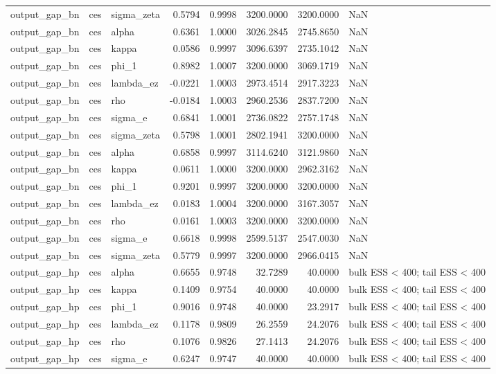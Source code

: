 \begin{tabular}{lllrrrrl}
output\_gap\_bn & ces & sigma\_zeta & 0.5794 & 0.9998 & 3200.0000 & 3200.0000 & NaN \\
output\_gap\_bn & ces & alpha & 0.6361 & 1.0000 & 3026.2845 & 2745.8650 & NaN \\
output\_gap\_bn & ces & kappa & 0.0586 & 0.9997 & 3096.6397 & 2735.1042 & NaN \\
output\_gap\_bn & ces & phi\_1 & 0.8982 & 1.0007 & 3200.0000 & 3069.1719 & NaN \\
output\_gap\_bn & ces & lambda\_ez & -0.0221 & 1.0003 & 2973.4514 & 2917.3223 & NaN \\
output\_gap\_bn & ces & rho & -0.0184 & 1.0003 & 2960.2536 & 2837.7200 & NaN \\
output\_gap\_bn & ces & sigma\_e & 0.6841 & 1.0001 & 2736.0822 & 2757.1748 & NaN \\
output\_gap\_bn & ces & sigma\_zeta & 0.5798 & 1.0001 & 2802.1941 & 3200.0000 & NaN \\
output\_gap\_bn & ces & alpha & 0.6858 & 0.9997 & 3114.6240 & 3121.9860 & NaN \\
output\_gap\_bn & ces & kappa & 0.0611 & 1.0000 & 3200.0000 & 2962.3162 & NaN \\
output\_gap\_bn & ces & phi\_1 & 0.9201 & 0.9997 & 3200.0000 & 3200.0000 & NaN \\
output\_gap\_bn & ces & lambda\_ez & 0.0183 & 1.0004 & 3200.0000 & 3167.3057 & NaN \\
output\_gap\_bn & ces & rho & 0.0161 & 1.0003 & 3200.0000 & 3200.0000 & NaN \\
output\_gap\_bn & ces & sigma\_e & 0.6618 & 0.9998 & 2599.5137 & 2547.0030 & NaN \\
output\_gap\_bn & ces & sigma\_zeta & 0.5779 & 0.9997 & 3200.0000 & 2966.0415 & NaN \\
output\_gap\_hp & ces & alpha & 0.6655 & 0.9748 & 32.7289 & 40.0000 & bulk ESS < 400; tail ESS < 400 \\
output\_gap\_hp & ces & kappa & 0.1409 & 0.9754 & 40.0000 & 40.0000 & bulk ESS < 400; tail ESS < 400 \\
output\_gap\_hp & ces & phi\_1 & 0.9016 & 0.9748 & 40.0000 & 23.2917 & bulk ESS < 400; tail ESS < 400 \\
output\_gap\_hp & ces & lambda\_ez & 0.1178 & 0.9809 & 26.2559 & 24.2076 & bulk ESS < 400; tail ESS < 400 \\
output\_gap\_hp & ces & rho & 0.1076 & 0.9826 & 27.1413 & 24.2076 & bulk ESS < 400; tail ESS < 400 \\
output\_gap\_hp & ces & sigma\_e & 0.6247 & 0.9747 & 40.0000 & 40.0000 & bulk ESS < 400; tail ESS < 400 \\

\end{tabular}
